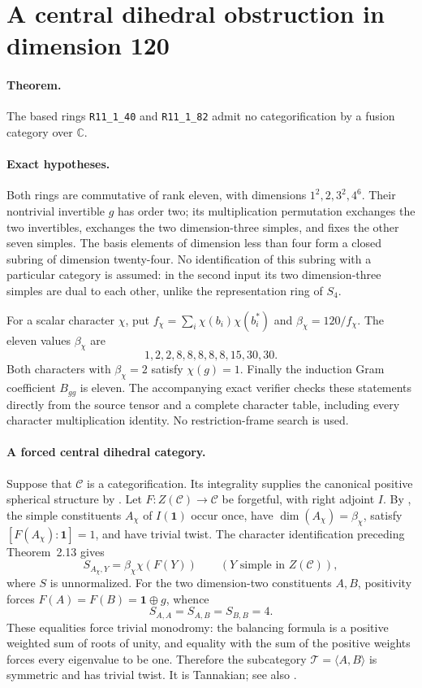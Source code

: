\section{A central dihedral obstruction in dimension 120}
\label{sec:rank11-d120}

\paragraph{Theorem.}
The based rings \texttt{R11\_1\_40} and \texttt{R11\_1\_82} admit no
categorification by a fusion category over $\mathbb C$.

\paragraph{Exact hypotheses.}
Both rings are commutative of rank eleven, with dimensions
$1^2,2,3^2,4^6$. Their nontrivial invertible $g$ has order two;
its multiplication permutation exchanges the two invertibles, exchanges
the two dimension-three simples, and fixes the other seven simples.
The basis elements of dimension less than four form a closed subring
of dimension twenty-four. No identification of this subring with a
particular category is assumed: in the second input its two dimension-three
simples are dual to each other, unlike the representation ring of $S_4$.

For a scalar character $\chi$, put
$f_\chi=\sum_i\chi(b_i)\chi(b_i^*)$ and $\beta_\chi=120/f_\chi$.
The eleven values $\beta_\chi$ are
\[
 1,2,2,8,8,8,8,8,15,30,30.
\]
Both characters with $\beta_\chi=2$ satisfy $\chi(g)=1$.
Finally the induction Gram coefficient $B_{gg}$ is eleven.
The accompanying exact verifier checks these statements directly from
the source tensor and a complete character table, including every
character multiplication identity. No restriction-frame search is used.

\paragraph{A forced central dihedral category.}
Suppose that $\mathcal C$ is a categorification. Its integrality supplies
the canonical positive spherical structure by
\cite[Proposition~8.24]{ENO}. Let $F:Z(\mathcal C)\to\mathcal C$ be
forgetful, with right adjoint $I$. By \cite[Theorems~2.5 and~2.13]{OstrikPivotal},
the simple constituents $A_\chi$ of $I(\mathbf1)$ occur once, have
$\dim(A_\chi)=\beta_\chi$, satisfy $[F(A_\chi):\mathbf1]=1$, and have
trivial twist. The character identification preceding Theorem~2.13 gives
\[
 S_{A_\chi,Y}=\beta_\chi\chi(F(Y))
 \qquad(Y\text{ simple in }Z(\mathcal C)),
\]
where $S$ is unnormalized. For the two dimension-two constituents $A,B$,
positivity forces $F(A)=F(B)=\mathbf1\oplus g$, whence
\[
 S_{A,A}=S_{A,B}=S_{B,B}=4.
\]
These equalities force trivial monodromy: the balancing formula is a
positive weighted sum of roots of unity, and equality with the sum of
the positive weights forces every eigenvalue to be one. Therefore the
subcategory $\mathcal T=\langle A,B\rangle$ is symmetric and has trivial
twist. It is Tannakian; see also \cite{DGNO}.

